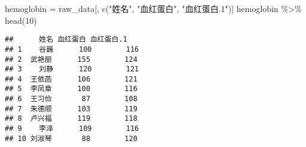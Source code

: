 \documentclass[
]{article}
\newenvironment{Shaded}{\begin{snugshade}}{\end{snugshade}}
\newcommand{\DecValTok}[1]{\textcolor[rgb]{0.00,0.00,0.81}{#1}}
\newcommand{\FloatTok}[1]{\textcolor[rgb]{0.00,0.00,0.81}{#1}}
\newcommand{\FunctionTok}[1]{\textcolor[rgb]{0.00,0.00,0.00}{#1}}
\newcommand{\NormalTok}[1]{#1}
\newcommand{\OtherTok}[1]{\textcolor[rgb]{0.56,0.35,0.01}{#1}}
\newcommand{\SpecialCharTok}[1]{\textcolor[rgb]{0.00,0.00,0.00}{#1}}
\newcommand{\StringTok}[1]{\textcolor[rgb]{0.31,0.60,0.02}{#1}}
\begin{document}
\begin{Shaded}
\begin{Highlighting}[]
\NormalTok{hemoglobin }\OtherTok{=}\NormalTok{ raw\_data[, }\FunctionTok{c}\NormalTok{(}\StringTok{"姓名"}\NormalTok{, }\StringTok{"血红蛋白"}\NormalTok{, }\StringTok{"血红蛋白.1"}\NormalTok{)]}
\NormalTok{hemoglobin }\SpecialCharTok{\%\textgreater{}\%} \FunctionTok{head}\NormalTok{(}\DecValTok{10}\NormalTok{)}
\end{Highlighting}
\end{Shaded}

\begin{verbatim}
##      姓名 血红蛋白 血红蛋白.1
## 1    谷巍      100        116
## 2  武艳丽      155        124
## 3    刘静      120        121
## 4  王依菡      106        121
## 5  李凤章      100        116
## 6  王习俭       87        108
## 7  朱德顺      103        119
## 8  卢兴福      119        118
## 9    李泽      109        116
## 10 刘淑琴       88        120
\end{verbatim}

\begin{Shaded}
\end{Shaded}
\end{document}
